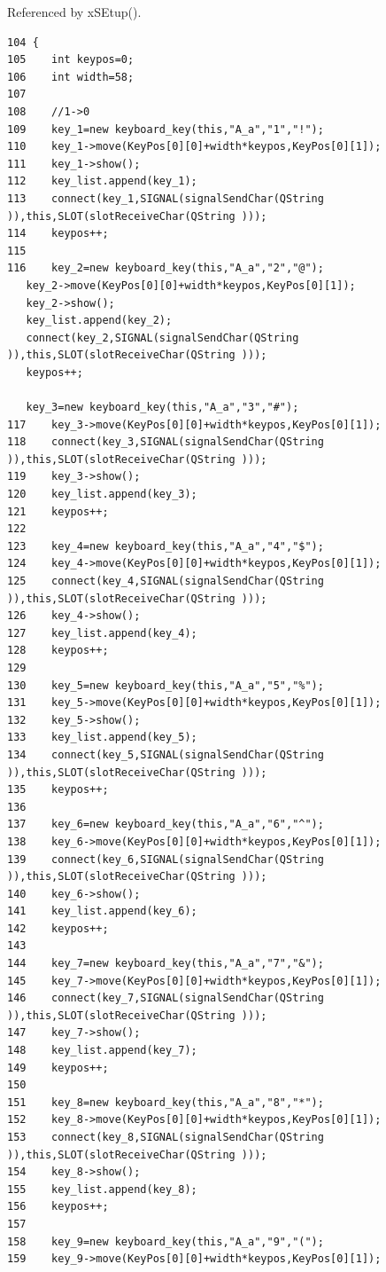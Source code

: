 Referenced by x\-SEtup().



\footnotesize\begin{verbatim}104 {
105    int keypos=0;
106    int width=58;
107    
108    //1->0
109    key_1=new keyboard_key(this,"A_a","1","!");
110    key_1->move(KeyPos[0][0]+width*keypos,KeyPos[0][1]);
111    key_1->show();
112    key_list.append(key_1);
113    connect(key_1,SIGNAL(signalSendChar(QString )),this,SLOT(slotReceiveChar(QString )));
114    keypos++;
115    
116    key_2=new keyboard_key(this,"A_a","2","@");
   key_2->move(KeyPos[0][0]+width*keypos,KeyPos[0][1]);
   key_2->show();
   key_list.append(key_2);
   connect(key_2,SIGNAL(signalSendChar(QString )),this,SLOT(slotReceiveChar(QString )));
   keypos++;
   
   key_3=new keyboard_key(this,"A_a","3","#");
117    key_3->move(KeyPos[0][0]+width*keypos,KeyPos[0][1]);
118    connect(key_3,SIGNAL(signalSendChar(QString )),this,SLOT(slotReceiveChar(QString )));
119    key_3->show();
120    key_list.append(key_3);
121    keypos++;
122    
123    key_4=new keyboard_key(this,"A_a","4","$");
124    key_4->move(KeyPos[0][0]+width*keypos,KeyPos[0][1]);
125    connect(key_4,SIGNAL(signalSendChar(QString )),this,SLOT(slotReceiveChar(QString )));
126    key_4->show();
127    key_list.append(key_4);
128    keypos++;
129    
130    key_5=new keyboard_key(this,"A_a","5","%");
131    key_5->move(KeyPos[0][0]+width*keypos,KeyPos[0][1]);
132    key_5->show();
133    key_list.append(key_5);
134    connect(key_5,SIGNAL(signalSendChar(QString )),this,SLOT(slotReceiveChar(QString )));
135    keypos++;
136    
137    key_6=new keyboard_key(this,"A_a","6","^");
138    key_6->move(KeyPos[0][0]+width*keypos,KeyPos[0][1]);
139    connect(key_6,SIGNAL(signalSendChar(QString )),this,SLOT(slotReceiveChar(QString )));
140    key_6->show();
141    key_list.append(key_6);
142    keypos++;
143    
144    key_7=new keyboard_key(this,"A_a","7","&");
145    key_7->move(KeyPos[0][0]+width*keypos,KeyPos[0][1]);
146    connect(key_7,SIGNAL(signalSendChar(QString )),this,SLOT(slotReceiveChar(QString )));
147    key_7->show();
148    key_list.append(key_7);
149    keypos++;
150    
151    key_8=new keyboard_key(this,"A_a","8","*");
152    key_8->move(KeyPos[0][0]+width*keypos,KeyPos[0][1]);
153    connect(key_8,SIGNAL(signalSendChar(QString )),this,SLOT(slotReceiveChar(QString )));
154    key_8->show();
155    key_list.append(key_8);
156    keypos++;
157    
158    key_9=new keyboard_key(this,"A_a","9","(");
159    key_9->move(KeyPos[0][0]+width*keypos,KeyPos[0][1]);

\end{verbatim}
